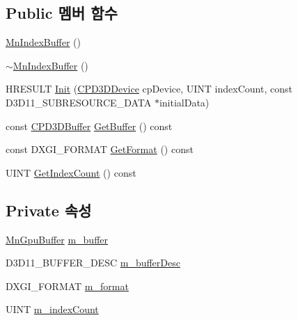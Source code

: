 \subsection*{Public 멤버 함수}
\begin{DoxyCompactItemize}
\item 
\hyperlink{class_m_n_l_1_1_mn_index_buffer_aaf66cb56ff4d0bed0b7ff1d784fff3f3}{Mn\+Index\+Buffer} ()
\item 
\hyperlink{class_m_n_l_1_1_mn_index_buffer_a6998f6b94aed324b016a85d47e9c83cc}{$\sim$\+Mn\+Index\+Buffer} ()
\item 
H\+R\+E\+S\+U\+LT \hyperlink{class_m_n_l_1_1_mn_index_buffer_ac5b1d0d65818b869497f265642fae509}{Init} (\hyperlink{namespace_m_n_l_a1eec210db8f309a4a9ac0d9658784c31}{C\+P\+D3\+D\+Device} cp\+Device, U\+I\+NT index\+Count, const D3\+D11\+\_\+\+S\+U\+B\+R\+E\+S\+O\+U\+R\+C\+E\+\_\+\+D\+A\+TA $\ast$initial\+Data)
\item 
const \hyperlink{namespace_m_n_l_aab9c90a8c27ac6410a9cc7cd89efeef1}{C\+P\+D3\+D\+Buffer} \hyperlink{class_m_n_l_1_1_mn_index_buffer_a5e0fe52326b487d0edfb30bb03b8b502}{Get\+Buffer} () const
\item 
const D\+X\+G\+I\+\_\+\+F\+O\+R\+M\+AT \hyperlink{class_m_n_l_1_1_mn_index_buffer_a65d7b963b3e376a0ab5fe6eb0cf946bd}{Get\+Format} () const
\item 
U\+I\+NT \hyperlink{class_m_n_l_1_1_mn_index_buffer_af4300e654b6bf847b4cba48b129cc664}{Get\+Index\+Count} () const
\end{DoxyCompactItemize}
\subsection*{Private 속성}
\begin{DoxyCompactItemize}
\item 
\hyperlink{class_m_n_l_1_1_mn_gpu_buffer}{Mn\+Gpu\+Buffer} \hyperlink{class_m_n_l_1_1_mn_index_buffer_a1dd52fcc71e02db79ee8b693c39423a8}{m\+\_\+buffer}
\item 
D3\+D11\+\_\+\+B\+U\+F\+F\+E\+R\+\_\+\+D\+E\+SC \hyperlink{class_m_n_l_1_1_mn_index_buffer_a36e716c1772bc9840bdd419bba026239}{m\+\_\+buffer\+Desc}
\item 
D\+X\+G\+I\+\_\+\+F\+O\+R\+M\+AT \hyperlink{class_m_n_l_1_1_mn_index_buffer_a426cdaa3bd2644dfc4880826cde9d333}{m\+\_\+format}
\item 
U\+I\+NT \hyperlink{class_m_n_l_1_1_mn_index_buffer_a273c18bf26ba770a8ebf008e6681720e}{m\+\_\+index\+Count}
\end{DoxyCompactItemize}



